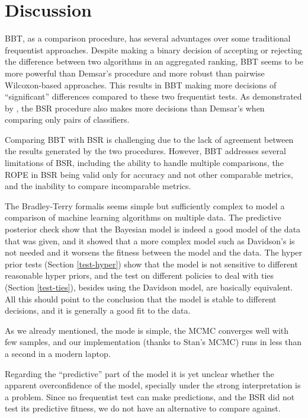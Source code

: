 \documentclass[twoside,11pt,preprint]{article}
\begin{document}
\hypertarget{discussion}{%
\section{\texorpdfstring{Discussion \label{sec:disc}}{Discussion }}\label{discussion}}

BBT, as a comparison procedure, has several advantages over some traditional frequentist approaches. Despite making a binary decision of accepting or rejecting the difference between two algorithms in an aggregated ranking, BBT seems to be more powerful than Demsar's procedure and more robust than pairwise Wilcoxon-based approaches. This results in BBT making more decisions of ``significant'' differences compared to these two frequentist tests. As demonstrated by \citet{benavoli2017time}, the BSR procedure also makes more decisions than Demsar's when comparing only pairs of classifiers.

Comparing BBT with BSR is challenging due to the lack of agreement between the results generated by the two procedures. However, BBT addresses several limitations of BSR, including the ability to handle multiple comparisons, the ROPE in BSR being valid only for accuracy and not other comparable metrics, and the inability to compare incomparable metrics.

The Bradley-Terry formalis seems simple but sufficiently complex to model a comparison of machine learning algorithms on multiple data. The predictive posterior check show that the Bayesian
model is indeed a good model of the data that was given, and it showed
that a more complex model such as Davidson's is not needed and it
worsens the fitness between the model and the data. The hyper prior
tests (Section \ref{test-hyper}) show that the model is not sensitive
to different reasonable hyper priors, and the test on different
policies to deal with ties (Section \ref{test-ties}), besides using
the Davidson model, are basically equivalent. All this should point to
the conclusion that the model is stable to different decisions, and it
is generally a good fit to the data.

As we already mentioned, the mode is simple, the MCMC converges well
with few samples, and our implementation (thanks to Stan's MCMC) runs
in less than a second in a modern laptop.

Regarding the ``predictive'' part of the model it is yet unclear whether
the apparent overconfidence of the model, specially under the strong
interpretation is a problem. Since no frequentist test can make
predictions, and the BSR did not test its predictive fitness, we do
not have an alternative to compare against.
\end{document}
